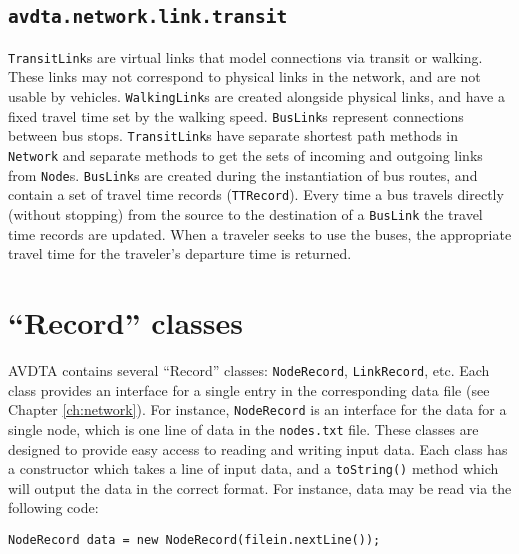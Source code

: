 \subsection{\texttt{avdta.network.link.transit}}

\texttt{TransitLink}s are virtual links that model connections via transit or walking. These links may not correspond to physical links in the network, and are not usable by vehicles. \texttt{WalkingLink}s are created alongside physical links, and have a fixed travel time set by the walking speed. \texttt{BusLink}s represent connections between bus stops. \texttt{TransitLink}s have separate shortest path methods in \texttt{Network} and separate methods to get the sets of incoming and outgoing links from \texttt{Node}s. \texttt{BusLink}s are created during the instantiation of bus routes, and contain a set of travel time records (\texttt{TTRecord}). Every time a bus travels directly (without stopping) from the source to the destination of a \texttt{BusLink} the travel time records are updated. When a traveler seeks to use the buses, the appropriate travel time for the traveler's departure time is returned.

\section{``Record'' classes}

AVDTA contains several ``Record'' classes: \texttt{NodeRecord}, \texttt{LinkRecord}, etc. Each class provides an interface for a single entry in the corresponding data file (see Chapter \ref{ch:network}). For instance, \texttt{NodeRecord} is an interface for the data for a single node, which is one line of data in the \texttt{nodes.txt} file. These classes are designed to provide easy access to reading and writing input data. Each class has a constructor which takes a line of input data, and a \texttt{toString()} method which will output the data in the correct format. For instance, data may be read via the following code:
\begin{algorithmic}[1]
 
\State\hspace{\algorithmicindent} \texttt{NodeRecord data = new NodeRecord(filein.nextLine());}
\State{\texttt{\}}}
\end{algorithmic}